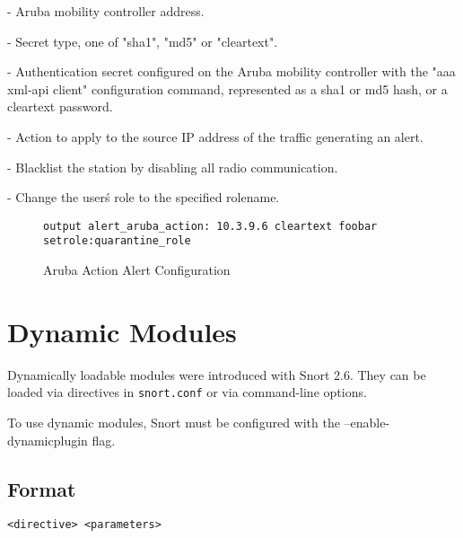 \documentclass[english]{report}
\newenvironment{note}{
\samepage
    \vspace{10pt}{\textsf{
        {\hspace{7pt}\Huge{$\triangle$\hspace{-12.5pt}{\Large{$^!$}}}}\hspace{5pt}
        {\Large{NOTE}}
    }
    }
   \begin{center}
    \par\vspace{-17pt}

    \begin{lrbox}{\savepar}
    \begin{minipage}[r]{6in}
}
{
    \end{minipage}
    \end{lrbox}
    \fbox{
        \usebox{
            \savepar
	}
    }
    \par\vskip10pt
    \end{center}
}
\newenvironment{note}{
        \begin{rawhtml}
        <p><table border="1"><tr><td><b>
        Note:&nbsp;&nbsp;</b>
        \end{rawhtml}
}{
        \begin{rawhtml}
        </b></td></tr></table></p>
        \end{rawhtml}
}
\begin{document}
\begin{description}{}
\item [\texttt{controller address}] - Aruba mobility controller address.
\item [\texttt{secrettype}] - Secret type, one of "sha1", "md5" or "cleartext".
\item [\texttt{secret}] - Authentication secret configured on the Aruba mobility controller with the "aaa xml-api client" configuration command, represented as a sha1 or md5 hash, or a cleartext password.
\item [\texttt{action}] - Action to apply to the source IP address of the traffic generating an alert.

  \begin{description}{}
      \item [\texttt{blacklist}]- Blacklist the station by disabling all radio communication.
      \item [\texttt{setrole:rolename}]- Change the user\'s role to the specified rolename.
  \end{description}
\end{description}

\begin{figure}[!hbpt]
\begin{verbatim}
output alert_aruba_action: 10.3.9.6 cleartext foobar setrole:quarantine_role
\end{verbatim}

\caption{\label{aruba_action configuration}Aruba Action Alert Configuration}
\end{figure}

\section{Dynamic Modules}

Dynamically loadable modules were introduced with Snort 2.6.  They can
be loaded via directives in \texttt{snort.conf} or via command-line options.

\begin{note}
To use dynamic modules, Snort must be configured with the
--enable-dynamicplugin flag.
\end{note}

\subsection{Format}

\begin{center}
\begin{verbatim}
<directive> <parameters>
\end{verbatim}
\end{center}
\end{document}
